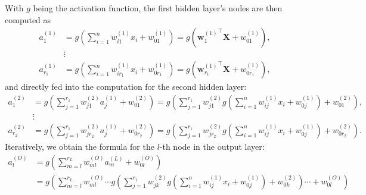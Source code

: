 With $g$ being the activation function, the first hidden layer's nodes are then computed as
\begin{align} 
    a_1^{(1)} &= g\left(\sum_{i=1}^{n} w_{i1}^{(1)} x_i + w_{01}^{(1)} \right) = g\left( {\mathbf{w}_1^{(1)}}^\top \mathbf{X} + w_{01}^{(1)} \right), \label{eq:first_layer_comp_1} \\
    &\vdots \nonumber \\
    a_{r_1}^{(1)} &= g\left(\sum_{i=1}^{n} w_{ir_1}^{(1)} x_i + w_{0r_1}^{(1)} \right) = g\left( {\mathbf{w}_{r_1}^{(1)}}^\top \mathbf{X} + w_{0r_1}^{(1)} \right), \label{eq:first_layer_comp_r1}
\end{align}
and directly fed into the computation for the second hidden layer:
\begin{align}
    a_1^{(2)} &= g\left(\sum_{j=1}^{r_1} w_{j1}^{(2)} a_j^{(1)} + w_{01}^{(2)} \right) = g\left(\sum_{j=1}^{r_1} w_{j1}^{(2)} g\left(\sum_{i=1}^{n} w_{ij}^{(1)} x_i + w_{0j}^{(1)} \right) + w_{01}^{(2)} \right), \label{eq:second_layer_comp_1} \\
    &\vdots \nonumber \\
    a_{r_2}^{(2)} &= g\left(\sum_{j=1}^{r_1} w_{jr_2}^{(2)} a_j^{(1)} + w_{0r_2}^{(2)} \right) = g\left(\sum_{j=1}^{r_1} w_{jr_2}^{(2)} g\left(\sum_{i=1}^{n} w_{ij}^{(1)} x_i + w_{0j}^{(1)} \right) + w_{0r_2}^{(2)} \right). \label{eq:second_layer_comp_r2}
\end{align}
Iteratively, we obtain the formula for the $l$-th node in the output layer:
\begin{align}
a_l^{(O)} &= g\left(\sum_{m=l}^{r_{L}} w_{ml}^{(O)} a_m^{(L)} + w_{0l}^{(O)} \right) \label{eq:last_layer_comp_1} \\
&= g\left(\sum_{m=l}^{r_L} w_{ml}^{(O)} \cdots g\left(\sum_{j=1}^{r_1} w_{jk}^{(2)} g\left(\sum_{i=1}^{n} w_{ij}^{(1)} x_i + w_{0j}^{(1)} \right) + w_{0k}^{(2)} \right) \cdots + w_{0l}^{(O)} \right) \label{eq:last_layer_comp_2}
\end{align}

